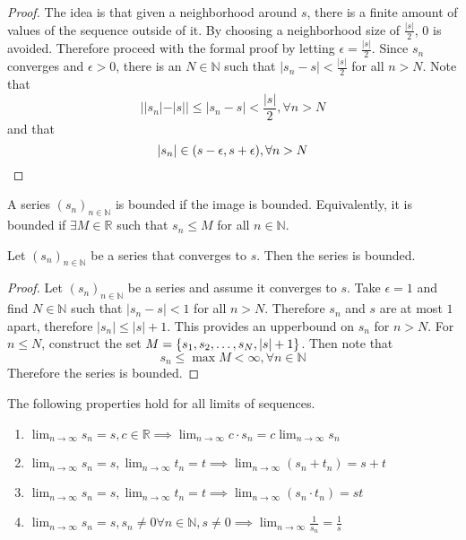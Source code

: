 \documentclass[../notes.tex]{subfiles}
\begin{document}
\begin{proof}
	The idea is that given a neighborhood around $s$, there is a finite amount of values of the sequence outside of it. By choosing a neighborhood size of $\frac{|s|}{2}$, 0 is avoided. Therefore proceed with the formal proof by letting $\epsilon = \frac{|s|}{2}$. Since $s_n$ converges and $\epsilon > 0$, there is an $N \in \mathbb{N}$ such that $|s_n - s| < \frac{|s|}{2}$ for all $n > N$. Note that
	\[
		||s_n| - |s|| \leq |s_n - s| < \frac{|s|}{2}, \forall n > N
	\]
	and that
	\[
		|s_n| \in \qty(s - \epsilon, s + \epsilon), \forall n > N
	\]
\end{proof}

\begin{definition}
	A series $(s_n)_{n\in \mathbb{N}}$ is bounded if the image is bounded. Equivalently, it is bounded if $\exists M \in \mathbb{R}$ such that $s_n \leq M$ for all $n \in \mathbb{N}$.
\end{definition}

\begin{theorem}
	Let $(s_n)_{n\in \mathbb{N}}$ be a series that converges to $s$. Then the series is bounded.
\end{theorem}

\begin{proof}
	Let $(s_n)_{n\in \mathbb{N}}$ be a series and assume it converges to $s$. Take $\epsilon = 1$ and find $N \in \mathbb{N}$ such that $|s_n - s| < 1$ for all $n > N$. Therefore $s_n$ and $s$ are at most $1$ apart, therefore $|s_n| \leq |s| + 1$. This provides an upperbound on $s_n$ for $n > N$. For $n \leq N$, construct the set $M = \qty{s_1, s_2, \ldots, s_N, |s| + 1}$. Then note that
	\[
		s_n \leq \max M < \infty, \forall n \in \mathbb{N} 
	\]
	Therefore the series is bounded.
\end{proof}

\begin{theorem}
	\label{thm:propsoflimits}
	The following properties hold for all limits of sequences.
	\begin{enumerate}[label=\alph*)]
		\item $\lim_{n\to\infty} s_n = s, c \in \mathbb{R} \implies \lim_{n\to\infty} c\cdot s_n = c\lim_{n\to\infty} s_n$
		\item $\lim_{n\to\infty} s_n = s, \lim_{n\to\infty} t_n = t \implies \lim_{n\to\infty} (s_n + t_n) = s + t$
		\item $\lim_{n\to\infty} s_n = s, \lim_{n\to\infty} t_n = t \implies \lim_{n\to\infty} (s_n \cdot t_n) = st$
		\item $\lim_{n\to\infty} s_n = s, s_n \neq 0 \forall n \in \mathbb{N}, s \neq 0 \implies \lim_{n\to\infty} \frac{1}{s_n} = \frac{1}{s}$
	\end{enumerate}
\end{theorem}
\end{document}
